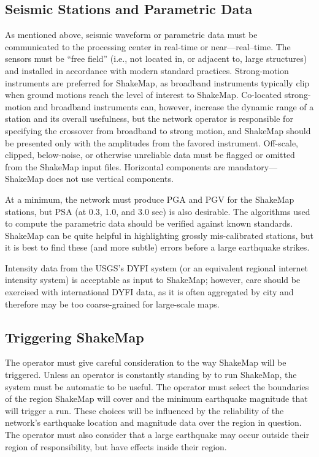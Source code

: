 \documentclass[letterpaper,10pt,english]{sphinxmanual}
\begin{document}
\subsection{Seismic Stations and Parametric Data}
\label{software_guide:seismic-stations-and-parametric-data}
As mentioned above, seismic waveform or parametric data must be communicated to the
processing center in real-time or near---real--time. The sensors must be ``free field'' (i.e., not
located in, or adjacent to, large structures) and installed in accordance with modern standard
practices. Strong-motion instruments are preferred for ShakeMap, as broadband
instruments typically clip when ground motions reach the level of interest to ShakeMap.
Co-located strong-motion and broadband instruments can, however, increase the dynamic
range of a station and its overall usefulness, but the network operator is responsible for
specifying the crossover from broadband to strong motion, and ShakeMap should be
presented only with the amplitudes from the favored instrument. Off-scale, clipped,
below-noise, or otherwise unreliable data must be flagged or omitted from the ShakeMap
input files. Horizontal components are mandatory---ShakeMap does not use vertical
components.

At a minimum, the network must produce PGA and PGV for the ShakeMap stations, but
PSA (at 0.3, 1.0, and 3.0 sec) is also desirable. The algorithms
used to compute the parametric data should be verified against known standards.
ShakeMap can be quite helpful in
highlighting grossly mis-calibrated stations, but it is best to find these (and more subtle)
errors before a large earthquake strikes.

Intensity data from the USGS's DYFI system (or an equivalent
regional internet intensity system) is acceptable as input to ShakeMap; however, care
should be exercised with international DYFI data, as it is often aggregated by city and
therefore may be too coarse-grained for large-scale maps.


\subsection{Triggering ShakeMap}
\label{software_guide:triggering-shakemap}
The operator must give careful consideration to the way ShakeMap will be triggered.
Unless an operator is constantly standing by to run ShakeMap, the system must be
automatic to be useful. The operator must select the boundaries of the region ShakeMap
will cover and the minimum earthquake magnitude that will trigger a run. These choices
will be influenced by the reliability of the network's earthquake location and magnitude
data over the region in question. The operator must also consider that a large earthquake may
occur outside their region of responsibility, but have effects inside their region.
\end{document}

